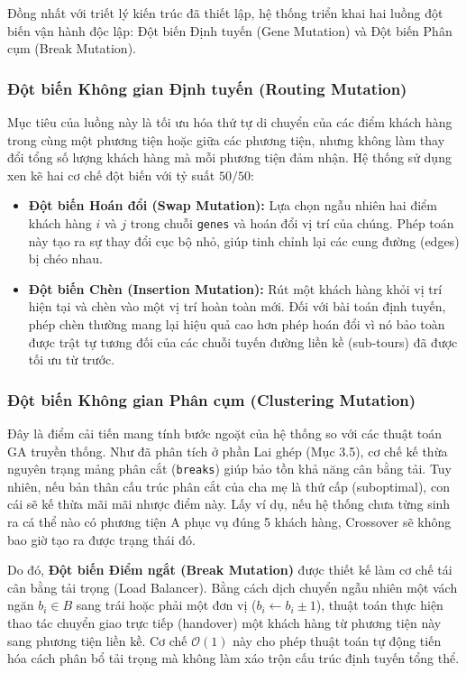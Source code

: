 \documentclass[12pt,a4paper]{article}
\numberwithin{figure}{subsection}
\begin{document}
Đồng nhất với triết lý kiến trúc đã thiết lập, hệ thống triển khai hai luồng đột biến vận hành độc lập: Đột biến Định tuyến (Gene Mutation) và Đột biến Phân cụm (Break Mutation).

\subsubsection{Đột biến Không gian Định tuyến (Routing Mutation)}

Mục tiêu của luồng này là tối ưu hóa thứ tự di chuyển của các điểm khách hàng trong cùng một phương tiện hoặc giữa các phương tiện, nhưng không làm thay đổi tổng số lượng khách hàng mà mỗi phương tiện đảm nhận. Hệ thống sử dụng xen kẽ hai cơ chế đột biến với tỷ suất $50/50$:
\begin{itemize}[label={ $\circ$}, leftmargin=1.5cm]
    \item \textbf{Đột biến Hoán đổi (Swap Mutation):} Lựa chọn ngẫu nhiên hai điểm khách hàng $i$ và $j$ trong chuỗi \texttt{genes} và hoán đổi vị trí của chúng. Phép toán này tạo ra sự thay đổi cục bộ nhỏ, giúp tinh chỉnh lại các cung đường (edges) bị chéo nhau.
    \item \textbf{Đột biến Chèn (Insertion Mutation):} Rút một khách hàng khỏi vị trí hiện tại và chèn vào một vị trí hoàn toàn mới. Đối với bài toán định tuyến, phép chèn thường mang lại hiệu quả cao hơn phép hoán đổi vì nó bảo toàn được trật tự tương đối của các chuỗi tuyến đường liền kề (sub-tours) đã được tối ưu từ trước.
\end{itemize}

\subsubsection{Đột biến Không gian Phân cụm (Clustering Mutation)}

Đây là điểm cải tiến mang tính bước ngoặt của hệ thống so với các thuật toán GA truyền thống. Như đã phân tích ở phần Lai ghép (Mục 3.5), cơ chế kế thừa nguyên trạng mảng phân cắt (\texttt{breaks}) giúp bảo tồn khả năng cân bằng tải. Tuy nhiên, nếu bản thân cấu trúc phân cắt của cha mẹ là thứ cấp (suboptimal), con cái sẽ kế thừa mãi mãi nhược điểm này. Lấy ví dụ, nếu hệ thống chưa từng sinh ra cá thể nào có phương tiện A phục vụ đúng 5 khách hàng, Crossover sẽ không bao giờ tạo ra được trạng thái đó.

Do đó, \textbf{Đột biến Điểm ngắt (Break Mutation)} được thiết kế làm cơ chế tái cân bằng tải trọng (Load Balancer). Bằng cách dịch chuyển ngẫu nhiên một vách ngăn $b_i \in B$ sang trái hoặc phải một đơn vị ($b_i \gets b_i \pm 1$), thuật toán thực hiện thao tác chuyển giao trực tiếp (handover) một khách hàng từ phương tiện này sang phương tiện liền kề. Cơ chế $\mathcal{O}(1)$ này cho phép thuật toán tự động tiến hóa cách phân bổ tải trọng mà không làm xáo trộn cấu trúc định tuyến tổng thể.
\end{document}

